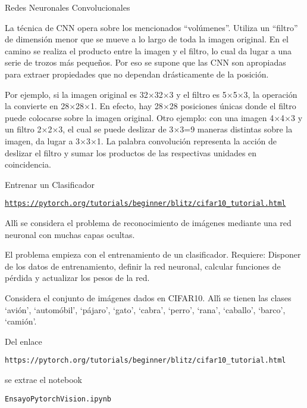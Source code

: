 \documentclass[10pd,hyperref={colorlinks=true}]{beamer}
\begin{document}

 \begin{frame}{Redes Neuronales Convolucionales}

 \vfill
 \centerline{}
 \vfill

 \end{frame}


 \begin{frame}{}

La t\'ecnica de CNN opera sobre los mencionados ``vol\'umenes''. Utiliza 
un ``filtro'' de dimensi\'on menor que se mueve a lo largo de toda la 
imagen original. En el camino se realiza el producto entre la imagen y 
el filtro, lo cual da lugar a una serie de trozos m\'as peque\~nos. Por 
eso se supone que las CNN son apropiadas para extraer propiedades que no 
dependan dr\'asticamente de la posici\'on.

Por ejemplo, si la imagen original es 32$\times$32$\times$3 y el filtro 
es 5$\times$5$\times$3, la operaci\'on la convierte en 
28$\times$28$\times$1. En efecto, hay 28$\times$28 posiciones \'unicas 
donde el filtro puede colocarse sobre la imagen original. Otro ejemplo: 
con una imagen 4$\times$4$\times$3 y un filtro 2$\times$2$\times$3, el 
cual se puede deslizar de 3$\times$3=9 maneras distintas sobre la 
imagen, da lugar a 3$\times$3$\times$1. La palabra convoluci\'on 
representa la acci\'on de deslizar el filtro y sumar los productos de 
las respectivas unidades en coincidencia.

 \end{frame}


 \begin{frame}{Entrenar un Clasificador}

\centerline{\texttt{\url{https://pytorch.org/tutorials/beginner/blitz/cifar10\_tutorial.html}}}
 
All\'{\i} se considera el problema de reconocimiento de im\'agenes 
mediante una red neuronal con muchas capas ocultas.

El problema empieza con el entrenamiento de un clasificador. Requiere: 
Disponer de los datos de entrenamiento, definir la red neuronal, 
calcular funciones de p\'erdida y actualizar los pesos de la red.

Considera el conjunto de im\'agenes dados en CIFAR10. All\'{\i} se 
tienen las clases `avi\'on', `autom\'obil', `p\'ajaro', `gato', `cabra', 
`perro', `rana', `caballo', `barco', `cami\'on'.

Del enlace

 \texttt{https://pytorch.org/tutorials/beginner/blitz/cifar10\_tutorial.html}

se extrae el notebook

 \centerline{\texttt{EnsayoPytorchVision.ipynb}}

 \end{frame}
\end{document}
